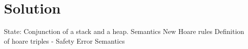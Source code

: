 \section{Solution}
State: Conjunction of a stack and a heap.
Semantics
New Hoare rules
Definition of hoare triples
 - Safety
Error Semantics